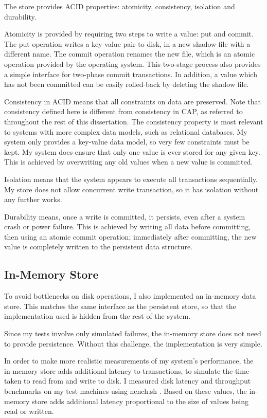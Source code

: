 \documentclass[12pt,a4paper,twoside,openany]{report}
\begin{document}
The store provides ACID properties: atomicity, consistency, isolation and durability.

Atomicity is provided by requiring two steps to write a value: put and commit. The put operation writes a key-value pair to disk, in a new shadow file with a different name. The commit operation renames the new file, which is an atomic operation provided by the operating system. This two-stage process also provides a simple interface for two-phase commit transactions. In addition, a value which has not been committed can be easily rolled-back by deleting the shadow file.

Consistency in ACID means that all constraints on data are preserved. Note that consistency defined here is different from consistency in CAP, as referred to throughout the rest of this dissertation. The consistency property is most relevant to systems with more complex data models, such as relational databases. My system only provides a key-value data model, so very few constraints must be kept. My system does ensure that only one value is ever stored for any given key. This is achieved by overwriting any old values when a new value is committed.

Isolation means that the system appears to execute all transactions sequentially. My store does not allow concurrent write transaction, so it has isolation without any further works.

Durability means, once a write is committed, it persists, even after a system crash or power failure. This is achieved by writing all data before committing, then using an atomic commit operation; immediately after committing, the new value is completely written to the persistent data structure.

\subsection{In-Memory Store}

To avoid bottlenecks on disk operations, I also implemented an in-memory data store. This matches the same interface as the persistent store, so that the implementation used is hidden from the rest of the system.

Since my tests involve only simulated failures, the in-memory store does not need to provide persistence. Without this challenge, the implementation is very simple.

In order to make more realistic measurements of my system's performance, the in-memory store adds additional latency to transactions, to simulate the time taken to read from and write to disk. I measured disk latency and throughput benchmarks on my test machines using nench.sh \cite{nench}. Based on these values, the in-memory store adds additional latency proportional to the size of values being read or written.
\end{document}
